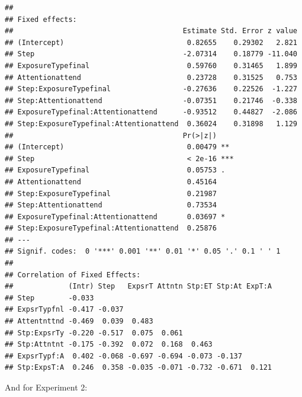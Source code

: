 \documentclass[11pt]{article}\usepackage[]{graphicx}\usepackage[]{color}
\makeatletter
\newenvironment{kframe}{%
 \def\at@end@of@kframe{}%
 \ifinner\ifhmode%
  \def\at@end@of@kframe{\end{minipage}}%
  \begin{minipage}{\columnwidth}%
 \fi\fi%
 \def\FrameCommand##1{\hskip\@totalleftmargin \hskip-\fboxsep
 \colorbox{shadecolor}{##1}\hskip-\fboxsep
     \hskip-\linewidth \hskip-\@totalleftmargin \hskip\columnwidth}%
 \MakeFramed {\advance\hsize-\width
   \@totalleftmargin\z@ \linewidth\hsize
   \@setminipage}}%
 {\par\unskip\endMakeFramed%
 \at@end@of@kframe}
\newenvironment{knitrout}{}{} %
\makeatother
\begin{document}
\begin{knitrout}
\begin{kframe}
\begin{verbatim}
## 
## Fixed effects:
##                                        Estimate Std. Error z value
## (Intercept)                             0.82655    0.29302   2.821
## Step                                   -2.07314    0.18779 -11.040
## ExposureTypefinal                       0.59760    0.31465   1.899
## Attentionattend                         0.23728    0.31525   0.753
## Step:ExposureTypefinal                 -0.27636    0.22526  -1.227
## Step:Attentionattend                   -0.07351    0.21746  -0.338
## ExposureTypefinal:Attentionattend      -0.93512    0.44827  -2.086
## Step:ExposureTypefinal:Attentionattend  0.36024    0.31898   1.129
##                                        Pr(>|z|)    
## (Intercept)                             0.00479 ** 
## Step                                    < 2e-16 ***
## ExposureTypefinal                       0.05753 .  
## Attentionattend                         0.45164    
## Step:ExposureTypefinal                  0.21987    
## Step:Attentionattend                    0.73534    
## ExposureTypefinal:Attentionattend       0.03697 *  
## Step:ExposureTypefinal:Attentionattend  0.25876    
## ---
## Signif. codes:  0 '***' 0.001 '**' 0.01 '*' 0.05 '.' 0.1 ' ' 1
## 
## Correlation of Fixed Effects:
##             (Intr) Step   ExpsrT Attntn Stp:ET Stp:At ExpT:A
## Step        -0.033                                          
## ExpsrTypfnl -0.417 -0.037                                   
## Attentnttnd -0.469  0.039  0.483                            
## Stp:ExpsrTy -0.220 -0.517  0.075  0.061                     
## Stp:Attntnt -0.175 -0.392  0.072  0.168  0.463              
## ExpsrTypf:A  0.402 -0.068 -0.697 -0.694 -0.073 -0.137       
## Stp:ExpsT:A  0.246  0.358 -0.035 -0.071 -0.732 -0.671  0.121
\end{verbatim}
\end{kframe}
\end{knitrout}

And for Experiment 2:
\end{document}

